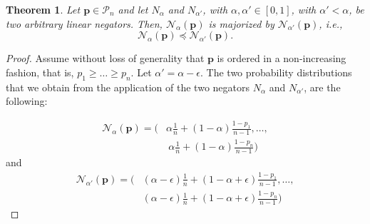 \documentclass[10pt,a4paper]{amsart}
\newtheorem{theorem}{Theorem}
\newcommand{\N}{\mathcal{N}}
\newcommand{\bp}{\mathbf{p}}
\newcommand{\cP}{\mathcal{P}}
\begin{document}
\begin{theorem}\label{th:majorization}
Let $\bp\in\cP_n$ and let $N_\alpha$ and $N_{\alpha'}$, with $\alpha, \alpha'\in[0,1]$, with 
$\alpha' <\alpha$, be two arbitrary linear negators. Then, $\N_\alpha(\bp)$ is majorized by $\N_{\alpha'}(\bp)$, i.e.,
\begin{equation}\label{majalpha}
\N_\alpha(\bp)\preceq \N_{\alpha'}(\bp).
\end{equation}
\end{theorem}

\begin{proof}
Assume without loss of generality that $\bp$ is ordered in a non-increasing fashion, that is, $p_1\geq\dots\geq p_n$. Let $\alpha'=\alpha-\epsilon$.
The two probability distributions that we obtain from the application of the two negators
 $N_\alpha$ and $N_{\alpha'}$, are the following:

\begin{align*}
     \N_\alpha(\bp) = \Biggl(&\alpha\frac{1}{n} + (1-\alpha)\frac{1-p_1}{n-1},\dots,\\&\ \alpha\frac{1}{n} + (1-\alpha)\frac{1-p_n}{n-1}\Biggr)
\end{align*}
and
\begin{align*}
    \N_{\alpha'}(\bp) = \Biggl(&(\alpha-\epsilon)\frac{1}{n} + (1-\alpha+\epsilon)\frac{1-p_1}{n-1},\dots,\\&(\alpha-\epsilon)\frac{1}{n} + (1-\alpha + \epsilon)\frac{1-p_n}{n-1}\Biggr)
\end{align*}


\end{proof}
\end{document}
